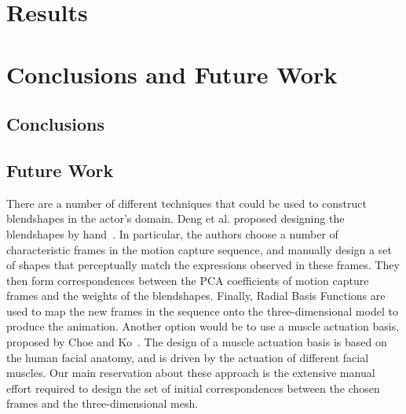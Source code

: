\documentclass[11pt]{report}
\begin{document}
\chapter{Results}




\chapter{Conclusions and Future Work}
\section{Conclusions}


\section{Future Work}



There are a number of different techniques that could be used to construct blendshapes in the actor's domain. Deng et al. proposed designing the blendshapes by hand~\cite{Deng:2006}. In particular, the authors choose a number of characteristic frames in the motion capture sequence, and manually design a set of shapes that perceptually match the expressions observed in these frames. They then form correspondences between the PCA coefficients of motion capture frames and the weights of the blendshapes. Finally, Radial Basis Functions are used to map the new frames in the sequence onto the three-dimensional model to produce the animation. Another option would be to use a muscle actuation basis, proposed by Choe and Ko~\cite{Choe:2005}. The design of a muscle actuation basis is based on the human facial anatomy, and is driven by the actuation of different facial muscles. Our main reservation about these approach is the extensive manual effort required to design the set of initial correspondences between the chosen frames and the three-dimensional mesh.





\newpage


\end{document}
